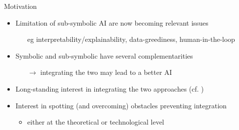 \documentclass[presentation]{beamer}\mode<presentation>{\usetheme{AMSBolognaFC}}
\begin{document}
\begin{frame}{Motivation}
    \begin{itemize}
        \item \alert{Limitation} of sub-symbolic AI are now becoming relevant \alert{issues} 
        \begin{itemize}
            \item[eg] interpretability/\alert{explainability}, data-greediness, human-in-the-loop
        \end{itemize}
        
        \vfill

        \item Symbolic and sub-symbolic have several \alert{complementarities}
        \begin{itemize}
            \item[$\rightarrow$] integrating the two may lead to a better AI
        \end{itemize}

        \vfill

        \item Long-standing interest in \alert{integrating} the two approaches (cf. \cite{IlkouK20})

        \vfill

        \item Interest in spotting (and overcoming) \alert{obstacles} preventing integration
        \begin{itemize}
            \item either at the theoretical or technological level
        \end{itemize}
    \end{itemize}
\end{frame}
\end{document}
